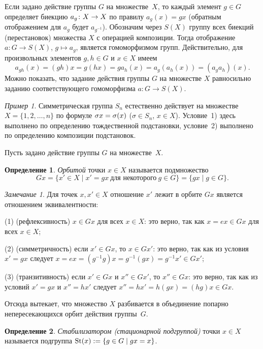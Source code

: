\documentclass[a4paper,10pt]{amsart}
\def\St{{\rm St}}%
\theoremstyle{definition}
\newtheorem{definition}{Определение}
\theoremstyle{remark}
\newtheorem{remark}{Замечание}
\newtheorem{example}{Пример}
\begin{document}
Если задано действие группы $G$ на множестве~$X$, то каждый элемент
$g \in G$ определяет биекцию $a_g \colon X \to\nobreak X$ по правилу
$a_g(x) = gx$ (обратным отображением для $a_g$ будет $a_{g^{-1}}$).
Обозначим через $S(X)$ группу всех биекций (перестановок) множества
$X$ с операцией композиции. Тогда отображение $a \colon G \to S(X)$,
$g \mapsto a_g$, является гомоморфизмом групп. Действительно, для
произвольных элементов $g,h \in G$ и $x \in X$ имеем
$$
a_{gh}(x) = (gh)x = g(hx) = g a_h(x) = a_g (a_h(x)) = (a_g a_h)(x).
$$
Можно показать, что задание действия группы $G$ на множестве $X$
равносильно заданию соответствующего гомоморфизма $a \colon G \to
S(X)$.

\begin{example}
Симметрическая группа $S_n$ естественно действует на множестве $X =
\lbrace 1, 2, \ldots, n \rbrace$ по формуле $\sigma x =\nobreak
\sigma (x)$ ($\sigma \in S_n$, $x \in X$). Условие~1) здесь
выполнено по определению тождественной подстановки, условие~2)
выполнено по определению композиции подстановок.
\end{example}

Пусть задано действие группы $G$ на множестве~$X$.

\begin{definition}
{\it Орбитой} точки $x\in X$ называется подмножество
$$
Gx = \lbrace x' \in X \mid x' = gx \ \text{для некоторого} \ g \in G
\rbrace = \{ gx \mid g\in G\}.
$$
\end{definition}

\begin{remark}
Для точек $x, x' \in X$ отношение \guillemotleft$x'$ лежит в орбите
$Gx$\guillemotright{} является отношением эквивалентности:

(1) (рефлексивность) $x \in Gx$ для всех $x \in X$: это верно, так
как $x = ex \in Gx$ для всех $x \in X$;

(2) (симметричность) если $x' \in Gx$, то $x \in Gx'$: это верно,
так как из условия $x' = gx$ следует $x = ex = (g^{-1}g)x =
g^{-1}(gx) = g^{-1}x' \in Gx'$;

(3) (транзитивность) если $x' \in Gx$ и $x'' \in Gx'$, то $x'' \in
Gx$: это верно, так как из условий $x' = gx$ и $x'' = hx'$ следует
$x'' = hx' = h(gx) = (hg)x \in Gx$.

Отсюда вытекает, что множество $X$ разбивается в объединение попарно
непересекающихся орбит действия группы~$G$.
\end{remark}

\begin{definition}
{\it Стабилизатором \textup(стационарной подгруппой\textup)} точки
$x \in X$ называется подгруппа $\St(x) := \{ g \in G \mid gx = x
\}$.
\end{definition}
\end{document}

